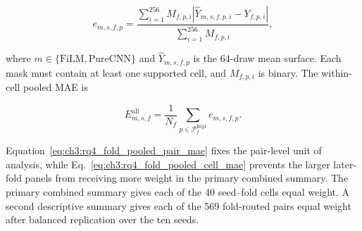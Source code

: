 \begin{equation}\label{eq:ch3:rq4_fold_pooled_pair_mae}
e_{m,s,f,p}
=
\frac{
\sum_{i=1}^{256}M_{f,p,i}
\left|\widehat{Y}_{m,s,f,p,i}-Y_{f,p,i}\right|
}{
\sum_{i=1}^{256}M_{f,p,i}
},
\end{equation}

where $m\in\{\mathrm{FiLM},\mathrm{PureCNN}\}$ and
$\widehat{Y}_{m,s,f,p}$ is the 64-draw mean surface.  Each mask must contain at
least one supported cell, and $M_{f,p,i}$ is binary.  The within-cell pooled
MAE is

\begin{equation}\label{eq:ch3:rq4_fold_pooled_cell_mae}
E^{\mathrm{all}}_{m,s,f}
=
\frac{1}{N_f}
\sum_{p\in\mathcal P_f^{\mathrm{RQ4}}}
e_{m,s,f,p}.
\end{equation}

Equation~\eqref{eq:ch3:rq4_fold_pooled_pair_mae} fixes the pair-level unit of
analysis, while Eq.~\eqref{eq:ch3:rq4_fold_pooled_cell_mae} prevents the larger
later-fold panels from receiving more weight in the primary combined summary.
The primary combined summary gives each of the 40 seed--fold cells equal
weight.  A second descriptive summary gives each of the 569 fold-routed pairs
equal weight after balanced replication over the ten seeds.

